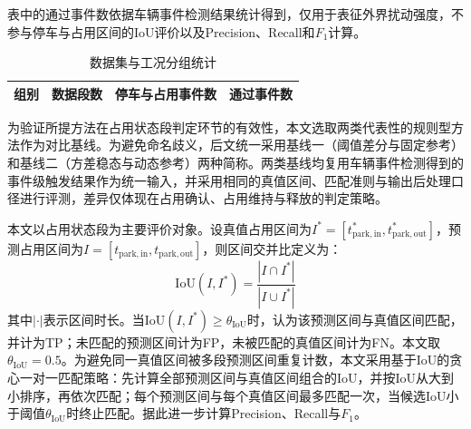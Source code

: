 \documentclass{xdupgthesis}
\providecommand{\FloatBarrier}{}
\begin{document}
表中的通过事件数依据车辆事件检测结果统计得到，仅用于表征外界扰动强度，不参与停车与占用区间的IoU评价以及Precision、Recall和$F_1$计算。

\begin{table}[H]
    \centering
    \caption{数据集与工况分组统计}
    \label{tab:ch4_dataset}
    \setlength{\tabcolsep}{8pt}
    \begin{tabular}{c c c c}
        \toprule
        组别 & 数据段数 & 停车与占用事件数 & 通过事件数 \\
        \midrule
        
    \end{tabular}
\end{table}
\FloatBarrier
\vspace{-16pt}

为验证所提方法在占用状态段判定环节的有效性，本文选取两类代表性的规则型方法作为对比基线。为避免命名歧义，后文统一采用基线一（阈值差分与固定参考）和基线二（方差稳态与动态参考）两种简称。两类基线均复用车辆事件检测得到的事件级触发结果作为统一输入，并采用相同的真值区间、匹配准则与输出后处理口径进行评测，差异仅体现在占用确认、占用维持与释放的判定策略。

本文以占用状态段为主要评价对象。设真值占用区间为$I^{*}=[t^{*}_{\mathrm{park,in}},t^{*}_{\mathrm{park,out}}]$，预测占用区间为$I=[t_{\mathrm{park,in}},t_{\mathrm{park,out}}]$，则区间交并比定义为：
\begin{equation}
    \mathrm{IoU}(I,I^{*})=\frac{|I\cap I^{*}|}{|I\cup I^{*}|}
\end{equation}
其中$|\cdot|$表示区间时长。当$\mathrm{IoU}(I,I^{*})\ge \theta_{\mathrm{IoU}}$时，认为该预测区间与真值区间匹配，并计为TP；未匹配的预测区间计为FP，未被匹配的真值区间计为FN。本文取$\theta_{\mathrm{IoU}}=0.5$。为避免同一真值区间被多段预测区间重复计数，本文采用基于IoU的贪心一对一匹配策略：先计算全部预测区间与真值区间组合的IoU，并按IoU从大到小排序，再依次匹配；每个预测区间与每个真值区间最多匹配一次，当候选IoU小于阈值$\theta_{\mathrm{IoU}}$时终止匹配。据此进一步计算Precision、Recall与$F_1$。
\end{document}
